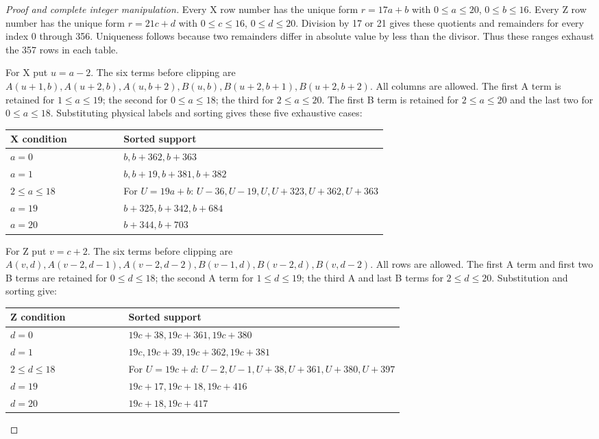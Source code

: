 \documentclass{article}
\begin{document}
\begin{proof}[Proof and complete integer manipulation]
  Every X row number has the unique
  form \(r = 17a + b\) with \(0 \le a \le 20\), \(0 \le b \le 16\). Every Z row number has the
  unique form \(r = 21c + d\) with \(0 \le c \le 16\), \(0 \le d \le 20\). Division by 17 or 21
  gives these quotients and remainders for every index 0 through 356. Uniqueness follows
  because two remainders differ in absolute value by less than the divisor. Thus these
  ranges exhaust the 357 rows in each table.

  For X put \(u = a - 2\). The six terms before clipping are
  \(A(u+1,b), A(u+2,b), A(u,b+2), B(u,b), B(u+2,b+1), B(u+2,b+2)\).
  All columns are allowed. The first A term is retained for \(1 \le a \le 19\);
  the second for \(0 \le a \le 18\); the third for \(2 \le a \le 20\). The first B term
  is retained for \(2 \le a \le 20\) and the last two for \(0 \le a \le 18\).
  Substituting physical labels and sorting gives these five exhaustive cases:

  \begin{center}
    \begin{tabular}{lp{0.7\linewidth}}
      X condition & Sorted support \\
      \hline
      \(a = 0\) & \(b, b+362, b+363\) \\
      \(a = 1\) & \(b, b+19, b+381, b+382\) \\
      \(2 \le a \le 18\) & For \(U = 19a + b\): \(U-36, U-19, U, U+323, U+362, U+363\) \\
      \(a = 19\) & \(b+325, b+342, b+684\) \\
      \(a = 20\) & \(b+344, b+703\) \\
    \end{tabular}
  \end{center}

  For Z put \(v = c + 2\). The six terms before clipping are
  \(A(v,d), A(v-2,d-1), A(v-2,d-2), B(v-1,d), B(v-2,d), B(v,d-2)\).
  All rows are allowed. The first A term and first two B terms are retained
  for \(0 \le d \le 18\); the second A term for \(1 \le d \le 19\); the third A and last B
  terms for \(2 \le d \le 20\). Substitution and sorting give:

  \begin{center}
    \begin{tabular}{lp{0.7\linewidth}}
      Z condition & Sorted support \\
      \hline
      \(d = 0\) & \(19c+38, 19c+361, 19c+380\) \\
      \(d = 1\) & \(19c, 19c+39, 19c+362, 19c+381\) \\
      \(2 \le d \le 18\) & For \(U = 19c + d\): \(U-2, U-1, U+38, U+361, U+380, U+397\) \\
      \(d = 19\) & \(19c+17, 19c+18, 19c+416\) \\
      \(d = 20\) & \(19c+18, 19c+417\) \\
    \end{tabular}
  \end{center}


\end{proof}
\end{document}

